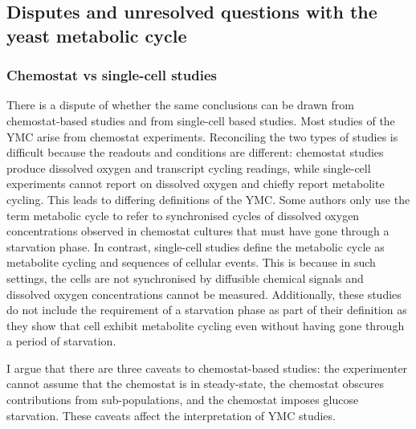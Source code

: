 \subsection[Disputes and unresolved questions]{Disputes and unresolved questions with the yeast metabolic cycle}
\label{subsec:intro-ymc-unresolved}

\subsubsection{Chemostat vs single-cell studies}
\label{subsubsec:intro-ymc-unresolved-chemostat_singlecell}

There is a dispute of whether the same conclusions can be drawn from chemostat-based studies and from single-cell based studies.
Most studies of the YMC arise from chemostat experiments.
Reconciling the two types of studies is difficult because the readouts and conditions are different:
chemostat studies produce dissolved oxygen and transcript cycling readings, while single-cell experiments cannot report on dissolved oxygen and chiefly report metabolite cycling.
This leads to differing definitions of the YMC\@.
Some authors \parencite{laxmanBehaviorMetabolicCycling2010, caustonMetabolicRhythmsFramework2018} only use the term metabolic cycle to refer to synchronised cycles of dissolved oxygen concentrations observed in chemostat cultures that must have gone through a starvation phase.
In contrast, single-cell studies \parencite{baumgartnerFlavinbasedMetabolicCycles2018, zylstraMetabolicDynamicsCell2022} define the metabolic cycle as metabolite cycling and sequences of cellular events.
This is because in such settings, the cells are not synchronised by diffusible chemical signals and dissolved oxygen concentrations cannot be measured.
Additionally, these studies do not include the requirement of a starvation phase as part of their definition as they show that cell exhibit metabolite cycling even without having gone through a period of starvation.

I argue that there are three caveats to chemostat-based studies:
the experimenter cannot assume that the chemostat is in steady-state,
the chemostat obscures contributions from sub-populations,
and the chemostat imposes glucose starvation.
These caveats affect the interpretation of YMC studies.


